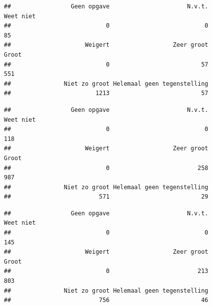 \documentclass[
]{book}
\newenvironment{Shaded}{\begin{snugshade}}{\end{snugshade}}
\newcommand{\CommentTok}[1]{\textcolor[rgb]{0.56,0.35,0.01}{\textit{#1}}}
\newcommand{\DataTypeTok}[1]{\textcolor[rgb]{0.13,0.29,0.53}{#1}}
\newcommand{\KeywordTok}[1]{\textcolor[rgb]{0.13,0.29,0.53}{\textbf{#1}}}
\newcommand{\NormalTok}[1]{#1}
\newcommand{\OperatorTok}[1]{\textcolor[rgb]{0.81,0.36,0.00}{\textbf{#1}}}
\newcommand{\StringTok}[1]{\textcolor[rgb]{0.31,0.60,0.02}{#1}}
\begin{document}
\begin{verbatim}
##                 Geen opgave                      N.v.t.                   Weet niet 
##                           0                           0                          85 
##                     Weigert                  Zeer groot                       Groot 
##                           0                          57                         551 
##               Niet zo groot Helemaal geen tegenstelling 
##                        1213                          57
\end{verbatim}

\begin{Shaded}
\end{Shaded}

\begin{verbatim}
##                 Geen opgave                      N.v.t.                   Weet niet 
##                           0                           0                         118 
##                     Weigert                  Zeer groot                       Groot 
##                           0                         258                         987 
##               Niet zo groot Helemaal geen tegenstelling 
##                         571                          29
\end{verbatim}

\begin{Shaded}
\end{Shaded}

\begin{verbatim}
##                 Geen opgave                      N.v.t.                   Weet niet 
##                           0                           0                         145 
##                     Weigert                  Zeer groot                       Groot 
##                           0                         213                         803 
##               Niet zo groot Helemaal geen tegenstelling 
##                         756                          46
\end{verbatim}

\begin{Shaded}
\end{Shaded}
\end{document}
